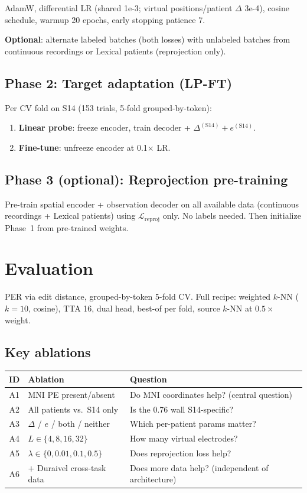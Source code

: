 \documentclass[11pt,letterpaper]{article}
\begin{document}
AdamW, differential LR (shared 1e-3; virtual positions/patient $\Delta$ 3e-4), cosine schedule, warmup 20 epochs, early stopping patience 7.

\textbf{Optional}: alternate labeled batches (both losses) with unlabeled batches from continuous recordings or Lexical patients (reprojection only).

\subsection{Phase 2: Target adaptation (LP-FT)}

Per CV fold on S14 (153 trials, 5-fold grouped-by-token):
\begin{enumerate}[leftmargin=2em]
\item \textbf{Linear probe}: freeze encoder, train decoder + $\Delta^{(\text{S14})} + e^{(\text{S14})}$.
\item \textbf{Fine-tune}: unfreeze encoder at 0.1$\times$ LR.
\end{enumerate}

\subsection{Phase 3 (optional): Reprojection pre-training}

Pre-train spatial encoder + observation decoder on all available data (continuous recordings + Lexical patients) using $\mathcal{L}_{\text{reproj}}$ only. No labels needed. Then initialize Phase~1 from pre-trained weights.


\section{Evaluation}

PER via edit distance, grouped-by-token 5-fold CV. Full recipe: weighted $k$-NN ($k{=}10$, cosine), TTA 16, dual head, best-of per fold, source $k$-NN at $0.5\times$ weight.

\subsection{Key ablations}

\begin{table}[ht]\centering\small
\begin{tabular}{@{}clp{7cm}@{}}
\toprule
\textbf{ID} & \textbf{Ablation} & \textbf{Question}\\
\midrule
A1 & MNI PE present/absent & Do MNI coordinates help? (central question)\\
A2 & All patients vs.\ S14 only & Is the 0.76 wall S14-specific?\\
A3 & $\Delta$ / $e$ / both / neither & Which per-patient params matter?\\
A4 & $L \in \{4, 8, 16, 32\}$ & How many virtual electrodes?\\
A5 & $\lambda \in \{0, 0.01, 0.1, 0.5\}$ & Does reprojection loss help?\\
A6 & $+$ Duraivel cross-task data & Does more data help? (independent of architecture)\\
\bottomrule
\end{tabular}
\end{table}
\end{document}
